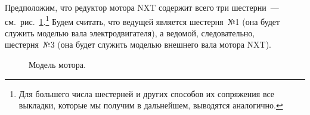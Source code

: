 \documentclass[12pt, a4paper, openany]{extarticle}
\begin{document}
Предположим, что редуктор мотора NXT содержит всего три шестерни~--- см.~рис.~\ref{gears}\lefteqn.\footnote{Для большего числа шестерней и других способов их сопряжения все выкладки, которые мы получим в дальнейшем, выводятся аналогично.}
Будем считать, что ведущей является шестерня~№1 (она будет служить моделью вала электродвигателя), а ведомой, следовательно, шестерня~№3 (она будет служить моделью внешнего вала мотора NXT).

\begin{figure}[h]
	\caption{Модель мотора.}
	\label{gears}
\end{figure}
\end{document}
